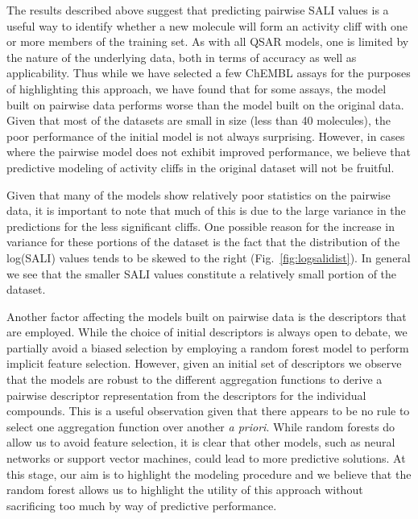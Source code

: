 \documentclass[letterpaper, 12pt]{article}
\begin{document}
The results described above suggest that predicting pairwise SALI values is a useful way to identify
whether a new molecule will form an activity cliff with one or more members of the training set. As
with all QSAR models, one is limited by the nature of the underlying data, both in terms of accuracy
as well as applicability. Thus while we have selected a few ChEMBL assays for the purposes of
highlighting this approach, we have found that for some assays, the model built on pairwise data
performs worse than the model built on the original data. Given that most of the datasets are small
in size (less than 40 molecules), the poor performance of the initial model is not always
surprising. However, in cases where the pairwise model does not exhibit improved performance, we
believe that predictive modeling of activity cliffs in the original dataset will not be fruitful.

Given that many of the models show relatively poor statistics on the pairwise data, it is important
to note that much of this is due to the large variance in the predictions for the less significant
cliffs. One possible reason for the increase in variance for these portions of the dataset is the
fact that the distribution of the log(SALI) values tends to be skewed to the right
(Fig.~\ref{fig:logsalidist}). In general we see that the smaller SALI values constitute a relatively
small portion of the dataset.

Another factor affecting the models built on pairwise data is the descriptors that are
employed. While the choice of initial descriptors is always open to debate, we partially avoid a
biased selection by employing a random forest model to perform implicit feature selection. However,
given an initial set of descriptors we observe that the models are robust to the different
aggregation functions to derive a pairwise descriptor representation from the descriptors for the
individual compounds. This is a useful observation given that there appears to be no rule to select
one aggregation function over another \emph{a priori}. While random forests do allow us to avoid
feature selection, it is clear that other models, such as neural networks or support vector
machines, could lead to more predictive solutions. At this stage, our aim is to highlight the
modeling procedure and we believe that the random forest allows us to highlight the utility of this
approach without sacrificing too much by way of predictive performance.
\end{document}
